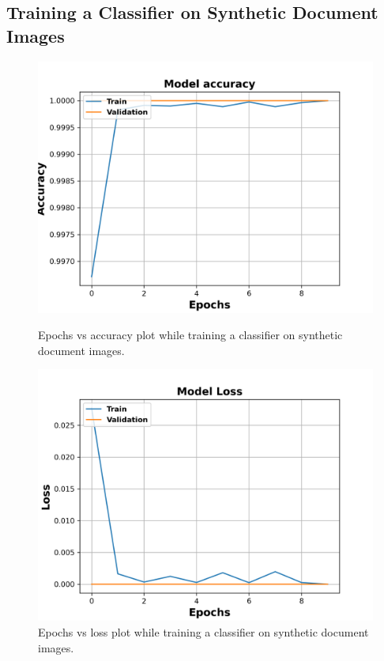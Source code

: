 \subsection{Training a Classifier on Synthetic Document Images}\label{trainingsyntheticclassifier}




\begin{figure}[H]
  \centering
  \begin{minipage}[b]{0.49\textwidth}
    \includegraphics[width=\textwidth]{images/Evaluation/Synthetic_Data_Classifier_2021-05-31_16-40-33_Accuracy.png}
    \caption[Epochs vs accuracy plot while training a classifier on synthetic document images.]{Epochs vs accuracy plot while training a classifier on synthetic document images.}
    \label{fig:SyntheticClassifierAcc}
  \end{minipage}
  \hfill
  \begin{minipage}[b]{0.49\textwidth}
    \includegraphics[width=\textwidth]{images/Evaluation/Synthetic_Data_Classifier_2021-05-31_16-40-33_Loss.png}
    \caption[Epochs vs loss plot while training a classifier on synthetic document images.]{Epochs vs loss plot while training a classifier on synthetic document images.}
    \label{fig:SyntheticClassifierLoss}
  \end{minipage}
\end{figure}


